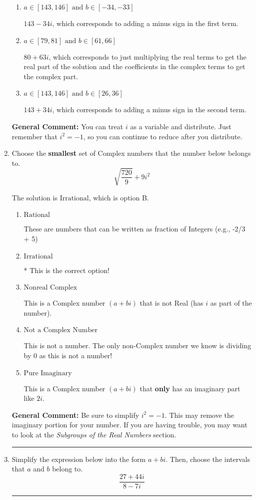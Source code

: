 \documentclass{extbook}[14pt]
\newcommand{\litem}[1]{\item #1

\rule{\textwidth}{0.4pt}}
\begin{document}
\begin{enumerate}
{\begin{enumerate}[label=\Alph*.]
 $17 - 146 i$, which corresponds to adding a minus sign in both terms.
\item \( a \in [143, 146] \text{ and } b \in [-34, -33] \)

 $143 - 34 i$, which corresponds to adding a minus sign in the first term.
\item \( a \in [79, 81] \text{ and } b \in [61, 66] \)

 $80 + 63 i$, which corresponds to just multiplying the real terms to get the real part of the solution and the coefficients in the complex terms to get the complex part.
\item \( a \in [143, 146] \text{ and } b \in [26, 36] \)

 $143 + 34 i$, which corresponds to adding a minus sign in the second term.
\end{enumerate}

\textbf{General Comment:} You can treat $i$ as a variable and distribute. Just remember that $i^2=-1$, so you can continue to reduce after you distribute.
}
\litem{
Choose the \textbf{smallest} set of Complex numbers that the number below belongs to.
\[ \sqrt{\frac{720}{9}}+9i^2 \]

The solution is \( \text{Irrational} \), which is option B.\begin{enumerate}[label=\Alph*.]
\item \( \text{Rational} \)

These are numbers that can be written as fraction of Integers (e.g., -2/3 + 5)
\item \( \text{Irrational} \)

* This is the correct option!
\item \( \text{Nonreal Complex} \)

This is a Complex number $(a+bi)$ that is not Real (has $i$ as part of the number).
\item \( \text{Not a Complex Number} \)

This is not a number. The only non-Complex number we know is dividing by 0 as this is not a number!
\item \( \text{Pure Imaginary} \)

This is a Complex number $(a+bi)$ that \textbf{only} has an imaginary part like $2i$.
\end{enumerate}

\textbf{General Comment:} Be sure to simplify $i^2 = -1$. This may remove the imaginary portion for your number. If you are having trouble, you may want to look at the \textit{Subgroups of the Real Numbers} section.
}
\litem{
Simplify the expression below into the form $a+bi$. Then, choose the intervals that $a$ and $b$ belong to.
\[ \frac{27 + 44 i}{8 - 7 i} \]

}
\end{enumerate}
\end{document}

